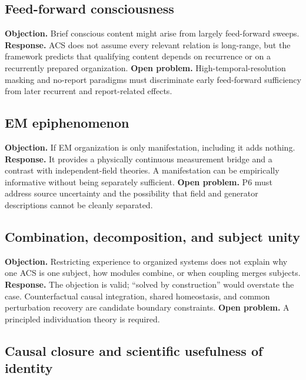 \documentclass[
  11pt,
  a4paper,
]{article}
\begin{document}
\subsection{Feed-forward
consciousness}\label{feed-forward-consciousness}

\textbf{Objection.} Brief conscious content might arise from largely
feed-forward sweeps. \textbf{Response.} ACS does not assume every
relevant relation is long-range, but the framework predicts that
qualifying content depends on recurrence or on a recurrently prepared
organization. \textbf{Open problem.} High-temporal-resolution masking
and no-report paradigms must discriminate early feed-forward sufficiency
from later recurrent and report-related effects.

\subsection{EM epiphenomenon}\label{em-epiphenomenon}

\textbf{Objection.} If EM organization is only manifestation, including
it adds nothing. \textbf{Response.} It provides a physically continuous
measurement bridge and a contrast with independent-field theories. A
manifestation can be empirically informative without being separately
sufficient. \textbf{Open problem.} P6 must address source uncertainty
and the possibility that field and generator descriptions cannot be
cleanly separated.

\subsection{Combination, decomposition, and subject
unity}\label{combination-decomposition-and-subject-unity}

\textbf{Objection.} Restricting experience to organized systems does not
explain why one ACS is one subject, how modules combine, or when
coupling merges subjects. \textbf{Response.} The objection is valid;
``solved by construction'' would overstate the case. Counterfactual
causal integration, shared homeostasis, and common perturbation recovery
are candidate boundary constraints. \textbf{Open problem.} A principled
individuation theory is required.

\subsection{Causal closure and scientific usefulness of
identity}\label{causal-closure-and-scientific-usefulness-of-identity}
\end{document}
